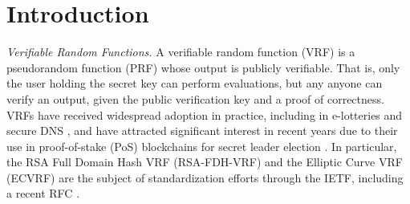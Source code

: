 
\section{Introduction}




\emph{Verifiable Random Functions.}
A verifiable random function (VRF) \cite{vrf_micali} is a pseudorandom function (PRF) whose output is publicly verifiable.
That is, only the user holding the secret key can perform evaluations, but any anyone can
verify an output, given the public verification key and a proof of correctness.
VRFs have received widespread adoption in practice, including in e-lotteries \cite{MicaliR02,LiangBM20} and secure DNS \cite{GoldbergNPRVZ15,PapadopoulosWHNVRG17}, and have attracted significant interest in recent years due to their use in proof-of-stake (PoS) blockchains for secret leader election \cite{KiayiasRDO17,DavidGKR17,BurdgesASV23a}.  %
In particular, the RSA Full Domain Hash VRF (RSA-FDH-VRF) and the Elliptic Curve VRF (ECVRF) are the subject of standardization efforts through the IETF, including a recent RFC \cite{VRF-RFC}.

